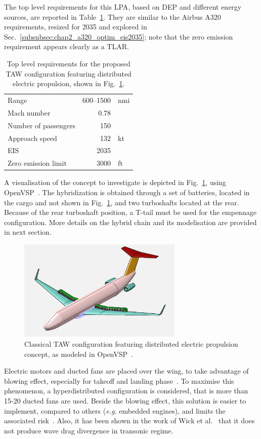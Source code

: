 The top level requirements for this LPA, based on DEP and different energy sources, are reported in Table~\ref{tab:tlar_aircraft_dep}.
They are similar to the Airbus A320 requirements, resized for 2035 and explored in Sec.~\ref{subsubsec:chap2_a320_optim_eis2035}; note that the zero emission requirement appears clearly as a TLAR.  
\begin{table}[!h]
	\centering
	\begin{tabular}{l r l}
		\hline
		Range & 600--1500 & nmi \\
		Mach number & 0.78 & \\
		Number of passengers & 150 & \\
		Approach speed & 132 & kt \\
		EIS & 2035 & \\
		Zero emission limit & 3000 & ft \\
		\hline
	\end{tabular}
	\caption{Top level requirements for the proposed TAW configuration featuring distributed electric propulsion, shown in Fig.~\ref{fig:aircraft_dep_concept}.}
	\label{tab:tlar_aircraft_dep}
\end{table}

A visualisation of the concept to investigate is depicted in Fig.~\ref{fig:aircraft_dep_concept}, using OpenVSP~\cite{bib:openvsp}. 
The hybridization is obtained through a set of batteries, located in the cargo and not shown in Fig.~\ref{fig:aircraft_dep_concept}, and two turboshafts located at the rear.
Because of the rear turboshaft position, a T-tail must be used for the empennage configuration. 
More details on the hybrid chain and its modelisation are provided in next section. 
\begin{figure}[!h]
	\centering
	\includegraphics[keepaspectratio, width=0.7\textwidth]{images/chap3/aircraft_dep_concept.jpg}
	\caption{Classical TAW configuration featuring distributed electric propulsion concept, as modeled in OpenVSP~\cite{bib:openvsp}.}
	\label{fig:aircraft_dep_concept}
\end{figure}
Electric motors and ducted fans are placed over the wing, to take advantage of blowing effect, especially for takeoff and landing phase~\cite{bib:moore_2018, bib:deere_2017b}. 
To maximise this phenomenon, a hyperdistributed configuration is considered, that is more than 15-20 ducted fans are used. 
Beside the blowing effect, this solution is easier to implement, compared to others (\textit{e.g.} embedded engines), and limits the associated risk~\cite{bib:mukhopadhyay_2018}. 
Also, it has been shown in the work of Wick et al.~\cite{bib:wick} that it does not produce wave drag divergence in transonic regime. 

